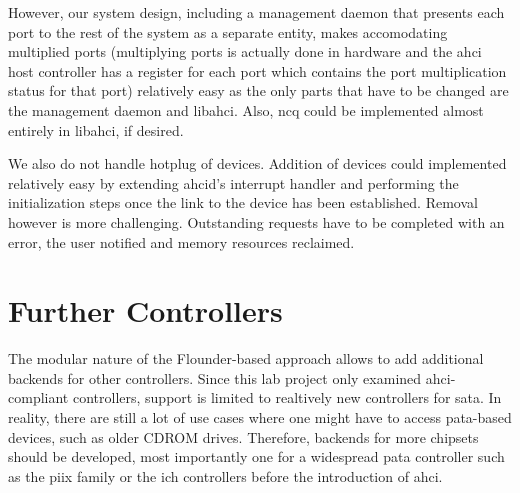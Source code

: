 However, our system design, including a management daemon that presents each
port to the rest of the system as a separate entity, makes accomodating
multiplied ports (multiplying ports is actually done in hardware and the
\ac{ahci} host controller has a register for each port which contains the port
multiplication status for that port) relatively easy as the only parts that
have to be changed are the management daemon and libahci. Also, \ac{ncq} could
be implemented almost entirely in libahci, if desired.

We also do not handle hotplug of devices. Addition of devices could implemented
relatively easy by extending ahcid's interrupt handler and performing the
initialization steps once the link to the device has been established. Removal
however is more challenging. Outstanding requests have to be completed with an
error, the user notified and memory resources reclaimed.

\section{Further Controllers}

The modular nature of the Flounder-based approach allows to add additional
backends for other controllers. Since this lab project only examined
\ac{ahci}-compliant controllers, support is limited to realtively new
controllers for \ac{sata}. In reality, there are still a lot of use cases where
one might have to access \ac{pata}-based devices, such as older CDROM drives.
Therefore, backends for more chipsets should be developed, most importantly one
for a widespread \ac{pata} controller such as the \acs{piix} family or the
\acs{ich} controllers before the introduction of \ac{ahci}.
